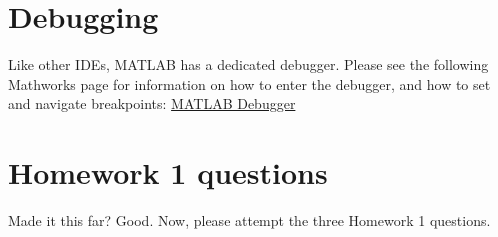 \documentclass{article}
\begin{document}
\section{Debugging}
\label{sec:debugger}

Like other IDEs, MATLAB has a dedicated debugger. Please see the following Mathworks page for information on how to enter the debugger, and how to set and navigate breakpoints:
\href{https://www.mathworks.com/help/matlab/matlab_prog/debugging-process-and-features.html}{MATLAB Debugger}


\section{Homework 1 questions}
Made it this far? Good. Now, please attempt the three Homework 1 questions.
\end{document}
